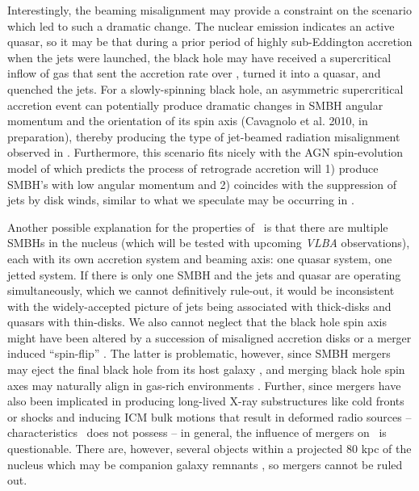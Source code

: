 \documentclass[useAMS,usenatbib]{mn2e}
\begin{document}
Interestingly, the beaming misalignment may provide a constraint on
the scenario which led to such a dramatic change. The nuclear emission
indicates an active quasar, so it may be that during a prior period of
highly sub-Eddington accretion when the jets were launched, the black
hole may have received a supercritical inflow of gas \citep[a
  hypothesized fueling mechanism for high-redshift quasars,
  \eg][]{2005ApJ...633..624V} that sent the accretion rate over
\dmcrit, turned it into a quasar, and quenched the jets. For a
slowly-spinning black hole, an asymmetric supercritical accretion
event can potentially produce dramatic changes in SMBH angular
momentum and the orientation of its spin axis (Cavagnolo et al. 2010,
in preparation), thereby producing the type of jet-beamed radiation
misalignment observed in \irs. Furthermore, this scenario fits nicely
with the AGN spin-evolution model of \citet{gesspin} which predicts
the process of retrograde accretion will 1) produce SMBH's with low
angular momentum and 2) coincides with the suppression of jets by disk
winds, similar to what we speculate may be occurring in \irs.

Another possible explanation for the properties of \irs\ is that there
are multiple SMBHs in the nucleus (which will be tested with upcoming
{\it{VLBA}} observations), each with its own accretion system and
beaming axis: one quasar system, one jetted system. If there is only
one SMBH and the jets and quasar are operating simultaneously, which
we cannot definitively rule-out, it would be inconsistent with the
widely-accepted picture of jets being associated with thick-disks and
quasars with thin-disks. We also cannot neglect that the black hole
spin axis might have been altered by a succession of misaligned
accretion disks \citep[\eg][]{2005MNRAS.363...49K} or a merger induced
``spin-flip'' \citep{2002Sci...297.1310M}. The latter is problematic,
however, since SMBH mergers may eject the final black hole from its
host galaxy \citep[\eg][]{2007ApJ...659L...5C}, and merging black hole
spin axes may naturally align in gas-rich environments
\citep{2007ApJ...661L.147B}. Further, since mergers have also been
implicated in producing long-lived X-ray substructures like cold
fronts or shocks \citep{2007PhR...443....1M} and inducing ICM bulk
motions that result in deformed radio sources
\citep{2009A&A...495..721S} -- characteristics \irs\ does not possess
-- in general, the influence of mergers on \irs\ is
questionable. There are, however, several objects within a projected
80 kpc of the nucleus which may be companion galaxy remnants
\citep{1996AJ....111..649S, 1999Ap&SS.266..113A}, so mergers cannot be
ruled out.
\end{document}
